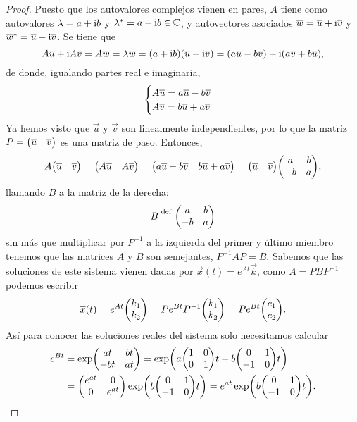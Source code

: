 \documentclass[../ecuaciones_diferenciales.tex]{subfiles}
\begin{document}
\begin{proof}
	Puesto que los autovalores complejos vienen en pares, \(A\) tiene como
	autovalores \(\lambda = a + \mathrm{i} b\) y 
	\({\lambda}^\ast = a - \mathrm{i} b \in \mathbb{C}\), 
	y autovectores asociados 
	\(\overline{w} = \overline{u} + \mathrm{i}\overline{v}\) y 
	\({\overline{w}}^\ast = \overline{u} - \mathrm{i}\overline{v}\). Se tiene que
	\[A\overline{u} + \mathrm{i} A\overline{v} 
		= A\overline{w} = \lambda \overline{w} 
		= (a + \mathrm{i} b)(\overline{u} + \mathrm{i} \overline{v}) 
		= (a\overline{u} - b\overline{v}) + \mathrm{i}(a\overline{v} + b\overline{u}),\]
	de donde, igualando partes real e imaginaria,
	\[\begin{cases}
		A\overline{u} = a\overline{u} - b\overline{v} \\
		A\overline{v} = b\overline{u} + a\overline{v}\end{cases}\]
	Ya hemos visto que \(\vec{u}\) y \(\vec{v}\) son linealmente independientes,
	por lo que la matriz \(P = \begin{pmatrix}\overline{u} & \overline{v}\end{pmatrix}\) 
	es una matriz de paso. Entonces,
	\[A \mat{\vec{u} & \vec{v}} 
		= \mat{A\vec{u} & A\vec{v}} 
		= \mat{a\vec{u} - b\vec{v} & b\vec{u} + a\vec{v}} 
		= \mat{\vec{u} & \vec{v}} \mat{a & b \\ -b & a},\]
	llamando \(B\) a la matriz de la derecha:
	\[B \overset{\operatorname{def}}{=} \begin{pmatrix}a & b \\ -b & a\end{pmatrix}\]
	sin más que multiplicar por \(P^{-1}\) a la izquierda del primer y último
	miembro tenemos que las matrices \(A\) y \(B\) son semejantes, 
	\(P^{-1}AP = B\). 
	Sabemos que las soluciones de este sistema vienen dadas por 
	\(\vec{x}(t) = e^{At} \vec{k}\), como \(A = PBP^{-1}\) podemos escribir 
	\[\vec{x}(t) = e^{At} \mat{k_1 \\ k_2} 
		= P e^{Bt} P^{-1} \mat{k_1 \\ k_2} 
		= P e^{Bt} \mat{c_1 \\ c_2}.\]
	Así para conocer las soluciones reales del sistema solo necesitamos calcular
	\begin{align*}
		e^{Bt} &= \exp\mat{at & bt \\ -bt & at} 
			= \exp\parens{a\mat{1 & 0 \\ 0 & 1}t + b\mat{0 & 1 \\ -1 & 0}t} \\
			&= \mat{e^{at}  & 0 \\ 0 & e^{at}} 
			\exp\left(b\mat{0 & 1 \\ -1 & 0}t\right) 
			= e^{at}\exp\left(b\mat{0 & 1 \\ -1 & 0}t\right).
	\end{align*}
	

\end{proof}
\end{document}
